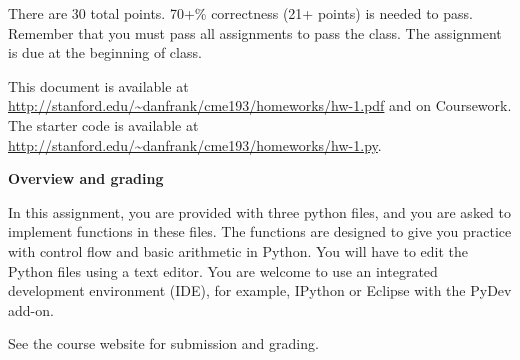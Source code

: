 \documentclass{article}
\newcounter{points}
\begin{document}
\pagestyle{fancy}

There are 30 total points.  70+\% correctness (21+ points) is needed to pass.  Remember that you must pass all assignments to pass the class.  The assignment is due at the beginning of class.

This document is available at \url{http://stanford.edu/~danfrank/cme193/homeworks/hw-1.pdf} and on Coursework.  The starter code is available at \url{http://stanford.edu/~danfrank/cme193/homeworks/hw-1.py}.

\vspace{0.3in}

\textbf{Overview and grading}

In this assignment, you are provided with three python files, and you are asked to implement functions in these files.  The functions are designed to give you practice with control flow and basic arithmetic in Python.  You will have to edit the Python files using a text editor.  You are welcome to use an integrated development environment (IDE), for example, IPython or Eclipse with the PyDev add-on.

See the course website for submission and grading.

\vspace{0.2in}
\end{document}
